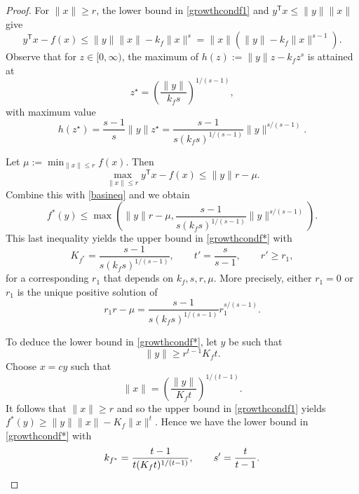 \documentclass[11pt,reqno]{amsart}
\theoremstyle{definition}
\theoremstyle{remark}
\begin{document}
\begin{proof}
For $\|x\|\ge r$, the lower bound in  \eqref{growthcondf1} and $y^\mathsf{T}x\le \|y\|\|x\|$ give
\begin{equation}\label{basineq}
y^\mathsf{T}x - f(x)\le \|y\|\|x\|-k_f\|x\|^s=\|x\|(\|y\| - k_f\|x\|^{s-1}).
\end{equation}
Observe that for $z \in [0, \infty)$, the maximum of $h(z):=\|y\| z- k_f z^s$ is attained at
\[
z^\star=\left(\frac{\|y\|}{k_f s}\right)^{1/(s-1)},
\]
with maximum value
\[
h(z^\star)=\frac{s-1}{s}\|y\|z^\star=\frac{s-1}{s (k_f s)^{1/(s-1)}} \|y\|^{s/(s-1)}.
\]

Let $\mu:=\min_{\lVert x \rVert \le r} f(x)$.  Then
\[
\max_{\lVert x \rVert \le r} y^\mathsf{T} x -f (x)\le \|y\| r-\mu.
\]
Combine this with \eqref{basineq} and we obtain
\[
f^*(y)\le \max\left(\|y\| r-\mu, \frac{s-1}{s (k_f s)^{1/(s-1)}} \|y\|^{s/(s-1)}\right).
\]
This last inequality yields the upper bound in \eqref{growthcondf*}
with 
\[
K_{f^*}= \frac{s-1}{s (k_f s)^{1/(s-1)}},\qquad t'=\frac{s}{s-1},\qquad r'\ge r_1,
\]
for a corresponding $r_1$  that depends on $k_f,s,r,\mu$.  More precisely, either $r_1=0$ or $r_1$ is the unique positive solution of
\[
r_1r-\mu=\frac{s-1}{s (k_f s)^{1/(s-1)}} r_1^{s/(s-1)}.
\]

To deduce the lower bound in \eqref{growthcondf*}, let $y$ be such that
\[
\|y\| \ge r^{t-1} K_f t.
\]
Choose $x = cy$ such that
\[
\|x\|= \left( \frac{\|y\|}{K_f t} \right)^{1/(t-1)}.
\]
It follows that $\| x \| \ge r $ and so  the upper bound in \eqref{growthcondf1} yields $f^*(y)\ge \|y\|\|x\|-K_f\|x\|^t $.
Hence we have the lower bound in \eqref{growthcondf*} with
\[
k_{f^*} = \frac{t-1}{t (K_f t)^{1/(t-1)}}, \qquad s'=\frac{t}{t-1}. \qedhere
\]
\end{proof}
\end{document}
